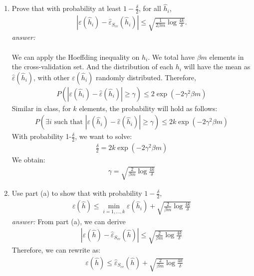 \documentclass{article}
\begin{document}
\begin{enumerate}[label=(\alph*)]
    \item Prove that with probability at least $1-\frac{\delta}{2}$, for all $\hat{h}_i$,\begin{align*}
        |\varepsilon(\hat{h}_i)-\hat{\varepsilon}_S_{cv}(\hat{h}_i)|\leq \sqrt{\frac{1}{2\beta m}\log \frac{4k}{\delta}}.
    \end{align*}
    \textit{answer: }\\\\
    We can apply the Hoeffding inequality on $h_i$. We total have $\beta m$ elements in the cross-validation set. And the distribution of each $h_i$ will have the mean as $\hat{\varepsilon}(\hat{h}_i)$, with other $\varepsilon(\hat{h}_i)$ randomly distributed. Therefore, \begin{align*}
        P(|\varepsilon(\hat{h}_i)-\hat{\varepsilon}(\hat{h}_i)|\geq \gamma)\leq 2\exp (-2\gamma^2\beta m)
    \end{align*}Similar in class, for $k$ elements, the probability will hold as follows: \begin{align*}
        P(\exists i \text{ such that } |\varepsilon(\hat{h}_i)-\hat{\varepsilon}(\hat{h}_i)|\geq \gamma)\leq 2k\exp (-2\gamma^2\beta m)
    \end{align*} With probability 1-$\frac{\delta}{2}$, we want to solve: \begin{align*}
        \frac{\delta}{2}=2k\exp (-2\gamma^2\beta m)
    \end{align*}We obtain: \begin{align*}
        \gamma = \sqrt{\frac{2}{\beta m}\log \frac{4k}{\delta}}
    \end{align*}
    \item Use part (a) to show that with probability $1-\frac{\delta}{2}$, \begin{align*}
        \varepsilon(\hat{h})\leq \min_{i=1,...,k}\varepsilon(\hat{h}_i)+\sqrt{\frac{2}{\beta m}\log \frac{4k}{\delta}}
    \end{align*}
    \textit{answer: } From part (a), we can derive \begin{align*}
        |\varepsilon(\hat{h})-\hat{\varepsilon}_S_{cv}(\hat{h})|\leq \sqrt{\frac{2}{\beta m}\log \frac{4k}{\delta}}
    \end{align*}Therefore, we can rewrite as: \begin{align*}
        &\varepsilon(\hat{h})\leq \hat{\varepsilon}_S_{cv}(\hat{h})+ \sqrt{\frac{2}{\beta m}\log \frac{4k}{\delta}}\\

\end{align*}
\end{enumerate}
\end{document}
